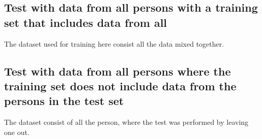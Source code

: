 
\subsection{Test with data from all persons with a training set that includes 
data from all}

The dataset used for training here consist all the data mixed together. 


\subsection{Test with data from all persons where the training set does not 
include data from 
the persons in the test set}

The dataset consist of all the person, where the test was performed by leaving one out.





